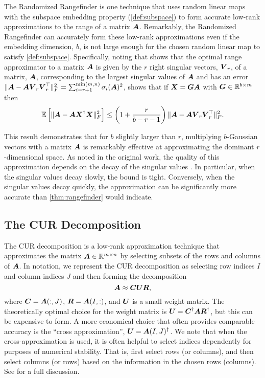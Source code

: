 The Randomized Rangefinder \cite{halko2011finding} is one technique that uses random linear maps with the subspace embedding property (\cref{def:subspace}) to form accurate low-rank approximations to the range of a matrix $\boldsymbol{A}$. Remarkably, the Randomized Rangefinder can accurately form these low-rank approximations even if the embedding dimension, $b$, is not large enough for the chosen random linear map to satisfy \cref{def:subspace}.  Specifically, noting that \cite{eckart1936approximation} shows that the optimal range approximator to a matrix $\boldsymbol{A}$ is given by the $r$ right singular vectors, $\boldsymbol{V}_r$, of a matrix, $\boldsymbol{A}$, corresponding to the largest singular values of $\boldsymbol{A}$ and has an error $\|\boldsymbol{A} - \boldsymbol{A}\boldsymbol{V}_r \boldsymbol{V}_r^\top\|_F^2 = \sum_{i=r+1}^{\min(m,n)}\sigma_i(\boldsymbol{A})^2$, \cite{halko2011finding} shows that if $\boldsymbol{X} = \boldsymbol{G} \boldsymbol{A}$ with $\boldsymbol{G} \in \mathbb{R}^{b \times m}$ 
then 
    \begin{equation}\label{thm:rangefinder}
     \ex \left[ \|\mat A - \mat A \mat{X}^\dagger \mat{X}\|_F^2 \right] \leq \left(1+\frac{r}{b-r-1}\right) \|\mat A - \mat A\mat V_r \mat V_r^\top\|_F^2.
    \end{equation} 

This result demonstrates that for $b$ slightly larger than $r$, multiplying $b$-Gaussian vectors with a matrix $\boldsymbol{A}$ is remarkably effective at approximating the dominant $r$-dimensional space. As noted in the original work, the quality of this approximation depends on the decay of the singular values \cite{halko2011finding}. In particular, when the singular values decay slowly, the bound is tight. Conversely, when the singular values decay quickly, the approximation can be significantly more accurate than \cref{thm:rangefinder} would indicate. 

\subsection{The CUR Decomposition}

The CUR decomposition is a low-rank approximation technique that approximates the matrix $\boldsymbol{ A} \in \mathbb{R}^{m \times n}$ by selecting subsets of the rows and columns of $\boldsymbol{A} $. In notation, we represent the CUR decomposition as selecting row indices $I$ and column indices $J$ and then forming the decomposition  
\begin{equation}
    \boldsymbol{A} \approx  \boldsymbol{C} \boldsymbol{U} \boldsymbol{R},
\end{equation}
where $\boldsymbol{C} = \boldsymbol{A}(:, J)$, $\boldsymbol{R} = \boldsymbol{A}(I,:)$, and $\boldsymbol{U}$ is a small weight matrix. The theoretically optimal choice for the weight matrix is $\boldsymbol{U} = \boldsymbol{C}^\dagger \boldsymbol{A} \boldsymbol{R}^\dagger$, but this can be expensive to form. A more economical choice that often provides comparable accuracy is the  ``cross approximation'', $\boldsymbol{U} = \boldsymbol{A}(I, J)^\dagger$. We note that when the cross-approximation is used, it is often helpful to select indices dependently for purposes of numerical stability. That is, first select rows (or columns), and then select columns (or rows) based on the information in the chosen rows (columns). See \cite{park2025accuracy} for a full discussion. 

